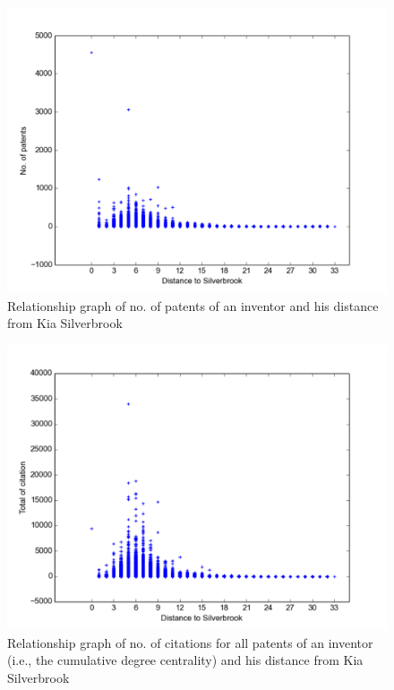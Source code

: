 \begin{figure}[t]
  \includegraphics[scale=0.425]{figure/distance_patents.pdf}
  \caption{\scriptsize Relationship graph of no. of patents of an inventor and his distance from Kia Silverbrook}
\label{fig:distance_patent}
\end{figure}

\begin{figure}[t]
  \includegraphics[scale=0.425]{figure/abc.pdf}
  \caption{\scriptsize Relationship graph of no. of citations for all patents of an inventor (i.e., the cumulative degree centrality) and his distance from Kia Silverbrook}
\label{fig:distance_citation}
\end{figure}



